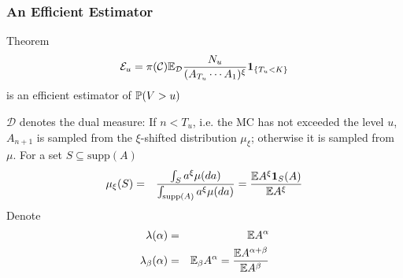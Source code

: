 \documentclass{beamer}
\begin{document}
\begin{frame}
  \frametitle{An Efficient Estimator}
  \begin{block}{Theorem}
    \[
    \mathcal E_u = \pi(\mathcal C) \E_{\mathcal D} {N_u
      \over
      (A_{T_u} \cdots A_1)^\xi
    }\1{T_u < K}
    \]
    is an efficient estimator of $\P(V > u)$
  \end{block}
\end{frame}

\begin{frame}
  $\mathcal D$ denotes the dual measure:
  If $n < T_u$, i.e. the MC
  has not exceeded the level $u$, $A_{n+1}$ is sampled from the
  $\xi$-shifted distribution $\mu_\xi$; otherwise it is sampled from
  $\mu$. For a set $S \subseteq \text{supp}(A)$
  \begin{eqnarray*}
    \mu_\xi (S) &=& {
      \int_{S} a^\xi \mu(da)
      \over
      \int_{\text{supp}(A)} a^\xi \mu(da)
    } = {\E A^\xi \I{S}(A)
      \over
      \E A^\xi
    }
  \end{eqnarray*}
  Denote
  \begin{eqnarray*}
    \lambda(\alpha) &=& \E A^{\alpha} \\
    \lambda_\beta(\alpha) &=& \E_\beta A^{\alpha} = {
      \E A^{\alpha + \beta}
      \over
      \E A^{\beta}
    }
  \end{eqnarray*}  
\end{frame}


\end{document}
